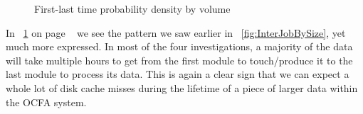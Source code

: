 \begin{figure}
{}
\caption{First-last time probability density by volume}
\label{fig:FirstLastBySize}
\end{figure}

In ~\ref{fig:FirstLastBySize} on page ~\pageref{fig:FirstLastBySize} we see the pattern we saw earlier in ~\ref{fig:InterJobBySize}, yet much more expressed. In most of the four investigations, a majority of the data will take multiple hours to get from the first module to touch/produce it to the last module to process its data. This is again a clear sign that we can expect a whole lot of disk cache misses during the lifetime of a piece of larger data within the OCFA system.
